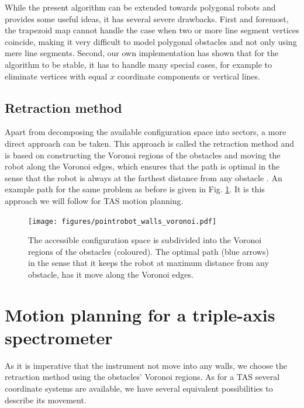 While the present algorithm can be extended towards polygonal robots \cite[Ch. 13.3, pp. 290-297]{Berg2008} and provides
some useful ideas, it has several severe drawbacks. First and foremost, the trapezoid map cannot handle the case when
two or more line segment vertices coincide, making it very difficult to model polygonal obstacles and not only using mere
line segments. Second, our own implementation has shown that for the algorithm to be stable, it has to handle many 
special cases, for example to eliminate vertices with equal $x$ coordinate components or vertical lines.

\vspace{0.5cm}

\subsection*{Retraction method}
Apart from decomposing the available configuration space into sectors, a more direct approach can be taken. This
approach is called the retraction method and is based on constructing the Voronoi regions 
of the obstacles and moving the robot along the Voronoi edges, which ensures that the path is optimal in the
sense that the robot is always at the farthest distance from any obstacle \cite[pp. 163 and 304]{Berg2008}.
An example path for the same problem as before is given in Fig. \ref{fig:robot_voronoi}.
It is this approach we will follow for TAS motion planning.

\begin{figure}[htb]
	\centering
	\texttt{[image: figures/pointrobot\_walls\_voronoi.pdf]}
	\caption{The accessible configuration space is subdivided into the Voronoi regions of the obstacles (coloured). The optimal
		path (blue arrows) in the sense that it keeps the robot at maximum distance from any obstacle, has it move along the 
		Voronoi edges.}
	\label{fig:robot_voronoi}
\end{figure}



\section{Motion planning for a triple-axis spectrometer}
\label{sec:tasrobot}

As it is imperative that the instrument not move into any walls, we choose the retraction method using the obstacles' Voronoi regions.
As for a TAS several coordinate systems are available, we have several equivalent possibilities to describe its movement. 


